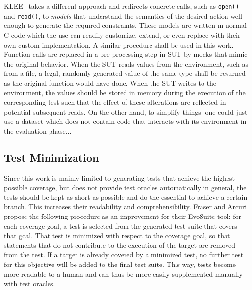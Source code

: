 \documentclass{article}
\begin{document}
KLEE~\cite{cadar2008klee} takes a different approach and redirects concrete calls, such as \lstinline{open()} and \lstinline{read()}, to \textit{models} that understand the semantics of the desired action well enough to generate the required constraints. These models are written in normal C code which the use can readily customize, extend, or even replace with their own custom implementation. A similar procedure shall be used in this work. Function calls are replaced in a pre-processing step in \ac{SUT} by mocks that mimic the original behavior. When the \ac{SUT} reads values from the environment, such as from a file, a legal, randomly generated value of the same type shall be returned as the original function would have done. When the \ac{SUT} writes to the environment, the values should be stored in memory during the execution of the corresponding test such that the effect of these alterations are reflected in potential subsequent reads. On the other hand, to simplify things, one could just use a dataset which does not contain code that interacts with its environment in the evaluation phase...

\subsection{Test Minimization}

Since this work is mainly limited to generating tests that achieve the highest possible coverage, but does not provide test oracles automatically in general, the tests should be kept as short as possible and do the essential to achieve a certain branch. This increases their readability and comprehensibility. Fraser and Arcuri~\cite{Fraser2013a} propose the following procedure as an improvement for their EvoSuite tool: for each coverage goal, a test is selected from the generated test suite that covers that goal. That test is minimized with respect to the coverage goal, so that statements that do not contribute to the execution of the target are removed from the test. If a target is already covered by a minimized test, no further test for this objective will be added to the final test suite. This way, tests become more readable to a human and can thus be more easily supplemented manually with test oracles. 
\end{document}
